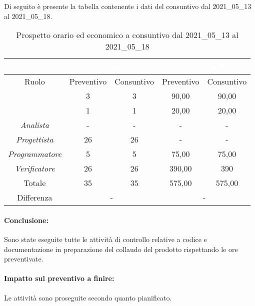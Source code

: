 Di seguito è presente la tabella contenente i dati del consuntivo dal 2021\_05\_13 al 2021\_05\_18.
\begin{table}[H]
	\centering
	\begin{tabular}{|c|c|c|c|c|}
		\rowcolor{darkblue} 
		&\multicolumn{2}{c|}{\textcolor{white}{Ore}}&\multicolumn{2}{c|}{\textcolor{white}{Costo in €}}\\ \hline
		Ruolo				&	Preventivo			&	Consuntivo		&	Preventivo	&	Consuntivo\\ \hline
		{\Responsabile}		&	3					&	3				&	90,00		&	90,00 \\ \hline
		{\Amministratore}	&	1					&	1				&	20,00		&	20,00 \\ \hline
		\textit{Analista}	&	-					&	-		&	-			&	- \\ \hline
		\textit{Progettista}& 	26					&   26 				& 	-		&  	- \\ \hline
		\textit{Programmatore}& 5					& 	5				& 	75,00		&  	75,00 \\ \hline
		\textit{Verificatore}&	26					&	26				&	390,00		&	390 \\ \hline
		Totale				&	35					&	35				&	575,00		&	575,00 \\ \hline
		Differenza			& 	\multicolumn{2}{c|}{-} 				&\multicolumn{2}{c|}{-}\\ \hline
	\end{tabular}
	\caption{Prospetto orario ed economico a consuntivo dal 2021\_05\_13 al 2021\_05\_18}
\end{table}
\paragraph*{Conclusione:}
Sono state eseguite tutte le attività di controllo relative a codice e documentazione in preparazione del collaudo del prodotto rispettando le ore preventivate.
\paragraph*{Impatto sul preventivo a finire:}
Le attività sono proseguite secondo quanto pianificato.